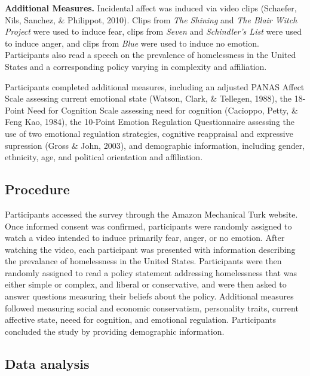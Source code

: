 \documentclass[man]{apa6}
\begin{document}
\textbf{Additional Measures.} Incidental affect was induced via video clips (Schaefer, Nils, Sanchez, \& Philippot, 2010). Clips from \emph{The Shining} and \emph{The Blair Witch Project} were used to induce fear, clips from \emph{Seven} and \emph{Schindler's List} were used to induce anger, and clips from \emph{Blue} were used to induce no emotion. Participants also read a speech on the prevalence of homelessness in the United States and a corresponding policy varying in complexity and affiliation.

Participants completed additional measures, including an adjusted PANAS Affect Scale assessing current emotional state (Watson, Clark, \& Tellegen, 1988), the 18-Point Need for Cognition Scale assessing need for cognition (Cacioppo, Petty, \& Feng Kao, 1984), the 10-Point Emotion Regulation Questionnaire assessing the use of two emotional regulation strategies, cognitive reappraisal and expressive supression (Gross \& John, 2003), and demographic information, including gender, ethnicity, age, and political orientation and affiliation.

\hypertarget{procedure}{%
\subsection{Procedure}\label{procedure}}

Participants accessed the survey through the Amazon Mechanical Turk website. Once informed consent was confirmed, participants were randomly assigned to watch a video intended to induce primarily fear, anger, or no emotion. After watching the video, each participant was presented with information describing the prevalance of homelessness in the United States. Participants were then randomly assigned to read a policy statement addressing homelessness that was either simple or complex, and liberal or conservative, and were then asked to answer questions measuring their beliefs about the policy. Additional measures followed measuring social and economic conservatism, personality traits, current affective state, neeed for cognition, and emotional regulation. Participants concluded the study by providing demographic information.

\hypertarget{data-analysis}{%
\subsection{Data analysis}\label{data-analysis}}
\end{document}
